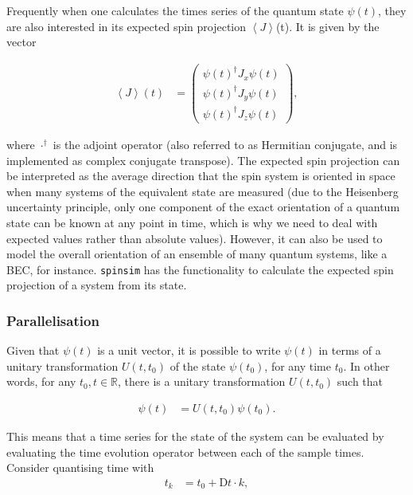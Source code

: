 \documentclass{jors}
\begin{document}
			Frequently when one calculates the times series of the quantum state \(\psi(t)\), they are also interested in its expected spin projection \(\left\langle J\right\rangle\)(t). It is given by the vector

			\begin{align}
				\left\langle J\right\rangle(t) &= \begin{pmatrix}
					\psi(t)^\dagger J_x \psi(t)\\
					\psi(t)^\dagger J_y \psi(t)\\
					\psi(t)^\dagger J_z \psi(t)
				\end{pmatrix},
			\end{align}

			where \(\cdot^\dagger\) is the adjoint operator (also referred to as Hermitian conjugate, and is implemented as complex conjugate transpose). The expected spin projection can be interpreted as the average direction that the spin system is oriented in space when many systems of the equivalent state are measured (due to the Heisenberg uncertainty principle, only one component of the exact orientation of a quantum state can be known at any point in time, which is why we need to deal with expected values rather than absolute values). However, it can also be used to model the overall orientation of an ensemble of many quantum systems, like a BEC, for instance. \texttt{spinsim} has the functionality to calculate the expected spin projection of a system from its state.

		\subsubsection*{Parallelisation}
			Given that \(\psi(t)\) is a unit vector, it is possible to write \(\psi(t)\) in terms of a unitary transformation \(U(t, t_0)\) of the state \(\psi(t_0)\), for any time \(t_0\). In other words, for any \(t_0,t \in \mathbb{R}\), there is a unitary transformation \(U(t, t_0)\) such that
			
			\begin{align}
				\psi(t) &= U(t, t_0)\psi(t_0).
			\end{align}
			
			This means that a time series for the state of the system can be evaluated by evaluating the time evolution operator between each of the sample times. Consider quantising time with
			\begin{align}
				t_k &= t_0 + \mathrm{D}t\cdot k,
			\end{align}
\end{document}
